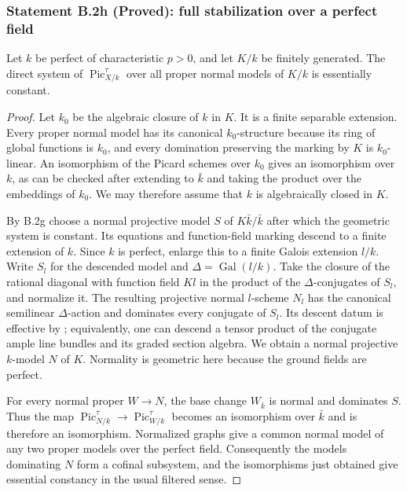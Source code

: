 \subsubsection*{Statement B.2h (Proved): full stabilization over a perfect field}
Let $k$ be perfect of characteristic $p>0$, and let $K/k$ be finitely
generated.  The direct system of $\operatorname{Pic}^{\tau}_{X/k}$ over
all proper normal models of $K/k$ is essentially constant.
\begin{proof}
Let $k_0$ be the algebraic closure of $k$ in $K$.  It is a finite
separable extension.  Every proper normal model has its canonical
$k_0$-structure because its ring of global functions is $k_0$, and
every domination preserving the marking by $K$ is $k_0$-linear.
An isomorphism of the Picard schemes over $k_0$ gives an isomorphism
over $k$, as can be checked after extending to $\bar k$ and taking
the product over the embeddings of $k_0$.  We may therefore assume
that $k$ is algebraically closed in $K$.

By B.2g choose a normal projective model $S$ of $K\bar k/\bar k$
after which the geometric system is constant.  Its equations and
function-field marking descend to a finite extension of $k$.  Since
$k$ is perfect, enlarge this to a finite Galois extension $l/k$.
Write $S_l$ for the descended model and $\Delta=\operatorname{Gal}(l/k)$.
Take the closure of the rational diagonal with function field $Kl$
in the product of the $\Delta$-conjugates of $S_l$, and normalize it.
The resulting projective normal $l$-scheme $N_l$ has the canonical
semilinear $\Delta$-action and dominates every conjugate of $S_l$.
Its descent datum is effective by
\cite[Lemma 39.25.3, Tag 0CCJ]{StacksB}; equivalently, one can descend
a tensor product of the conjugate ample line bundles and its graded
section algebra.  We obtain a normal projective $k$-model $N$ of $K$.
Normality is geometric here because the ground fields are perfect.

For every normal proper $W\to N$, the base change $W_{\bar k}$ is
normal and dominates $S$.  Thus the map
$\operatorname{Pic}^{\tau}_{N/k}\to\operatorname{Pic}^{\tau}_{W/k}$
becomes an isomorphism over $\bar k$ and is therefore an isomorphism.
Normalized graphs give a common normal model of any two proper
models over the perfect field.  Consequently the models dominating
$N$ form a cofinal subsystem, and the isomorphisms just obtained
give essential constancy in the usual filtered sense.
\end{proof}

